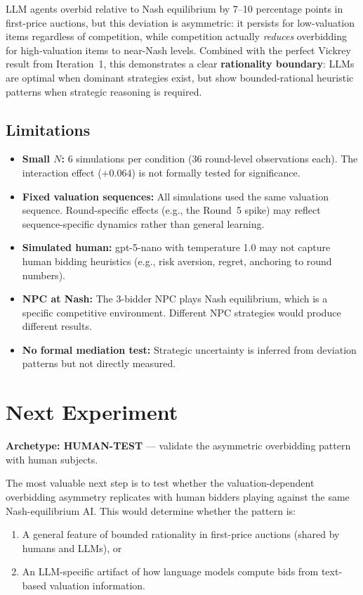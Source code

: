 \documentclass[11pt]{article}
\begin{document}
LLM agents overbid relative to Nash equilibrium by 7--10 percentage points in first-price auctions, but this deviation is asymmetric: it persists for low-valuation items regardless of competition, while competition actually \emph{reduces} overbidding for high-valuation items to near-Nash levels. Combined with the perfect Vickrey result from Iteration~1, this demonstrates a clear \textbf{rationality boundary}: LLMs are optimal when dominant strategies exist, but show bounded-rational heuristic patterns when strategic reasoning is required.

\subsection*{Limitations}

\begin{itemize}
    \item \textbf{Small $N$:} 6 simulations per condition (36 round-level observations each). The interaction effect ($+0.064$) is not formally tested for significance.
    \item \textbf{Fixed valuation sequences:} All simulations used the same valuation sequence. Round-specific effects (e.g., the Round~5 spike) may reflect sequence-specific dynamics rather than general learning.
    \item \textbf{Simulated human:} gpt-5-nano with temperature 1.0 may not capture human bidding heuristics (e.g., risk aversion, regret, anchoring to round numbers).
    \item \textbf{NPC at Nash:} The 3-bidder NPC plays Nash equilibrium, which is a specific competitive environment. Different NPC strategies would produce different results.
    \item \textbf{No formal mediation test:} Strategic uncertainty is inferred from deviation patterns but not directly measured.
\end{itemize}

\section*{Next Experiment}

\textbf{Archetype: HUMAN-TEST} --- validate the asymmetric overbidding pattern with human subjects.

The most valuable next step is to test whether the valuation-dependent overbidding asymmetry replicates with human bidders playing against the same Nash-equilibrium AI. This would determine whether the pattern is:
\begin{enumerate}
    \item[(a)] A general feature of bounded rationality in first-price auctions (shared by humans and LLMs), or
    \item[(b)] An LLM-specific artifact of how language models compute bids from text-based valuation information.
\end{enumerate}
\end{document}
